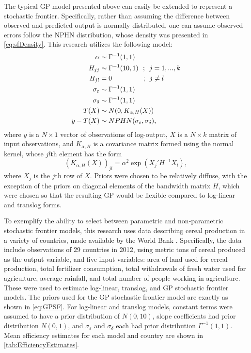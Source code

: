 \documentclass[twocolumn]{article}
\newcommand{\ep}{\varepsilon}
\begin{document}
The typical GP model presented above can easily be extended to represent a stochastic frontier. Specifically, rather than assuming the difference between observed and predicted output is normally distributed, one can assume observed errors follow the NPHN distribution, whose density was presented in \cref{eq:sfDensity}. This research utilizes the following model:
\begin{subequations}
\label{eq:GPSF}
\begin{align}
	\alpha&\sim \Gamma^{-1}(1, 1)\\
	H_{jj}&\sim \Gamma^{-1}(10, 1) \mbox{\ \ ;\ \ }j=1,...,k\\
	H_{jl} &= 0 \mbox{\hspace*{4.3em} ;\ \ }j\neq l\\
	\sigma_\ep &\sim \Gamma^{-1}(1, 1)\\
	\sigma_\delta &\sim \Gamma^{-1}(1, 1)\\
	T(X)&\sim N(0, K_{\alpha, H}(X))\\
	y - T(X)&\sim NPHN(\sigma_\ep, \sigma_\delta),
\end{align}
\end{subequations}
where $y$ is a $N\times 1$ vector of observations of log-output, $X$ is a $N\times k$ matrix of input observations, and $K_{\alpha, H}$ is a covariance matrix formed using the normal kernel, whose $jl$th element has the form
\begin{equation}
	\left(K_{\alpha, H}(X)\right)_{jl} = \alpha^2 \exp\left(X_j' H^{-1} X_l\right),
\end{equation}
where $X_j$ is the $j$th row of $X$. Priors were chosen to be relatively diffuse, with the exception of the priors on diagonal elements of the bandwidth matrix $H$, which were chosen so that the resulting GP would be flexible compared to log-linear and translog forms.



To exemplify the ability to select between parametric and non-parametric stochastic frontier models, this research uses data describing cereal production in a variety of countries, made available by the World Bank \citep{WorldBank}. Specifically, the data include observations of 29 countries in 2012, using metric tons of cereal produced as the output variable, and five input variables: area of land used for cereal production, total fertilizer consumption, total withdrawals of fresh water used for agriculture, average rainfall, and total number of people working in agriculture. These were used to estimate log-linear, translog, and GP stochastic frontier models. The priors used for the GP stochastic frontier model are exactly as shown in \cref{eq:GPSF}. For log-linear and translog models, constant terms were assumed to have a prior distribution of $N(0, 10)$, slope coefficients had prior distribution $N(0, 1)$, and $\sigma_\ep$ and $\sigma_\delta$ each had prior distribution $\Gamma^{-1}(1, 1)$. Mean efficiency estimates for each model and country are shown in \cref{tab:EfficiencyEstimates}.
\end{document}
